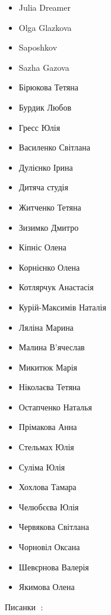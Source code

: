 \begin{itemize}
  \item Julia Dreamer
  \item Olga Glazkova
  \item Saposhkov
  \item Sazha Gazova
  \item Бірюкова Тетяна
  \item Бурдик Любов
  \item Гресс Юлія
  \item Василенко Світлана
  \item Дулієнко Ірина
  \item Дитяча студія
  \item Житченко Тетяна
  \item Зизимко Дмитро
  \item Кіпніс Олена
  \item Корнієнко Олена
  \item Котлярчук Анастасія
  \item Курій-Максимів Наталія
  \item Ляліна Марина
  \item Малина В'ячеслав
  \item Микитюк Марія
  \item Ніколаєва Тетяна
  \item Остапченко Наталья
  \item Прімакова Анна
  \item Стельмах Юлія
  \item Суліма Юлія
  \item Хохлова Тамара
  \item Челюбєєва Юлія
  \item Червякова Світлана
  \item Чорновіл Оксана
  \item Шевєрнова Валерія
  \item Якимова Олена
\end{itemize}

Писанки 🥚:

